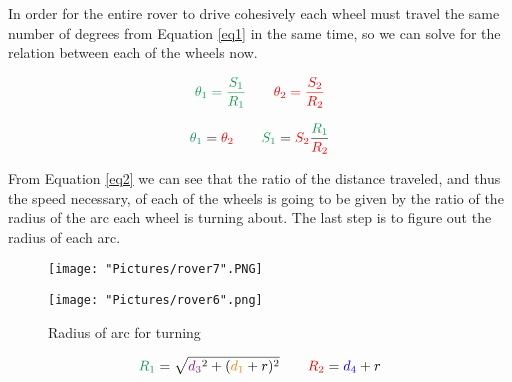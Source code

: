 \documentclass[12pt]{article}
\begin{document}
\noindent In order for the entire rover to drive cohesively each wheel must travel the same number of degrees from Equation \ref{eq1} in the same time, so we can solve for the relation between each of the wheels now.

\begin{equation}
	\textcolor{ForestGreen}{\theta_1 = \frac{S_1}{R_1}} \qquad \textcolor{red}{\theta_2 = \frac{S_2}{R_2}}
\end{equation}

\begin{equation}
	\textcolor{ForestGreen}{\theta_1} = \textcolor{red}{\theta_2} \qquad \textcolor{ForestGreen}{S_1}=\textcolor{red}{S_2} \frac{\textcolor{ForestGreen}{R_1}}{\textcolor{red}{R_2}}
	\label{eq2}
\end{equation}

\noindent From Equation \ref{eq2} we can see that the ratio of the distance traveled, and thus the speed necessary, of each of the wheels is going to be given by the ratio of the radius of the arc each wheel is turning about. The last step is to figure out the radius of each arc. 

\begin{figure}[H]
 	\centering
  	\begin{minipage}[b]{0.45\textwidth}
		\texttt{[image: "Pictures/rover7".PNG]}
  	\end{minipage}
  	\hfill
  	\begin{minipage}[b]{0.45\textwidth}
    		\texttt{[image: "Pictures/rover6".png]}
  	\end{minipage}
  	\caption{Radius of arc for turning}
	\label{r4}
\end{figure}

\begin{equation}
	\textcolor{ForestGreen}{R_1} = \sqrt{\textcolor{Plum}{d_3}^2 + (\textcolor{orange}{d_1} + r)^2}            \qquad \textcolor{red}{R_2} = \textcolor{blue}{d_4} + r
	\label{eq3}
\end{equation}
\end{document}
